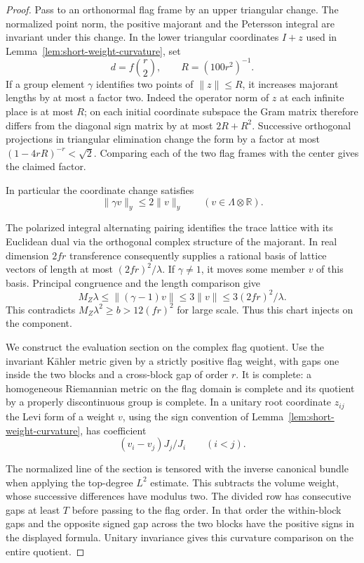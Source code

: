 \begin{proof}
Pass to an orthonormal flag frame by an upper triangular change. The normalized point norm, the positive majorant and the Petersson integral are invariant under this change. In the lower triangular coordinates \(I+z\) used in Lemma~\ref{lem:short-weight-curvature}, set
\[
       d=f\binom r2,\qquad R=(100r^2)^{-1}.
\]
If a group element \(\gamma\) identifies two points of \(\|z\|\le R\), it increases majorant lengths by at most a factor two. Indeed the operator norm of \(z\) at each infinite place is at most \(R\); on each initial coordinate subspace the Gram matrix therefore differs from the diagonal sign matrix by at most \(2R+R^2\). Successive orthogonal projections in triangular elimination change the form by a factor at most \((1-4rR)^{-r}<\sqrt2\). Comparing each of the two flag frames with the center gives the claimed factor.

In particular the coordinate change satisfies
\[
           \|\gamma v\|_y\le 2\|v\|_y\qquad(v\in\Lambda\otimes\mathbb R).
\]

The polarized integral alternating pairing identifies the trace lattice with its Euclidean dual via the orthogonal complex structure of the majorant. In real dimension \(2fr\) transference consequently supplies a rational basis of lattice vectors of length at most \((2fr)^2/\lambda\). If \(\gamma\ne1\), it moves some member \(v\) of this basis. Principal congruence and the length comparison give
\[
      M_Z\lambda\le\|(\gamma-1)v\|
          \le3\|v\|\le3(2fr)^2/\lambda .
\]
This contradicts \(M_Z\lambda^2\ge b> 12(fr)^2\) for large scale. Thus this chart injects on the component. \cite{banaszczyk}

We construct the evaluation section on the complex flag quotient. Use the invariant Kähler metric given by a strictly positive flag weight, with gaps one inside the two blocks and a cross-block gap of order \(r\). It is complete: a homogeneous Riemannian metric on the flag domain is complete and its quotient by a properly discontinuous group is complete. In a unitary root coordinate \(z_{ij}\) the Levi form of a weight \(v\), using the sign convention of Lemma~\ref{lem:short-weight-curvature}, has coefficient
\[
           (v_i-v_j)J_j/J_i\qquad(i<j).
\]

The normalized line of the section is tensored with the inverse canonical bundle when applying the top-degree \(L^2\) estimate. This subtracts the volume weight, whose successive differences have modulus two. The divided row has consecutive gaps at least \(T\) before passing to the flag order. In that order the within-block gaps and the opposite signed gap across the two blocks have the positive signs in the displayed formula. Unitary invariance gives this curvature comparison on the entire quotient.


\end{proof}
